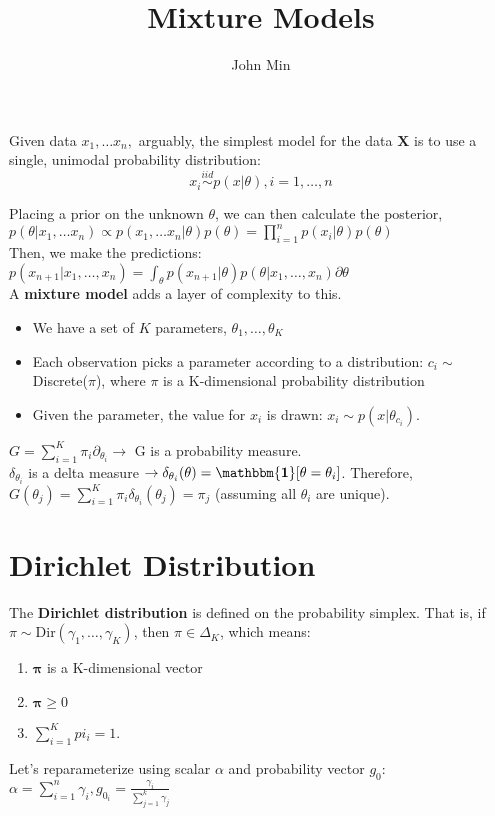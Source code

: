 \documentclass{article}
\title{Mixture Models}
\author{John Min}
\begin{document}
\maketitle

\noindent
Given data $x_1, \ldots x_n,$ arguably, the simplest model for the data $\mathbf{X}$ is to use a single, unimodal probability distribution: 
$$ x_i \overset{iid}{\sim} p(x | \theta), i = 1, \ldots, n $$

\noindent
Placing a prior on the unknown $\theta$, we can then calculate the posterior, $p(\theta | x_1, \ldots x_n ) \propto p(x_1, \ldots x_n | \theta) p(\theta) = \displaystyle \prod_{i=1}^n p(x_i | \theta) p(\theta)$ \\

\noindent
Then, we make the predictions: $p(x_{n+1} | x_1, \ldots, x_n) = \int_\theta p(x_{n+1} | \theta) p(\theta | x_1, \ldots, x_n) \partial \theta$ \\

\noindent
A \textbf{mixture model} adds a layer of complexity to this.
\begin{itemize}
    \item We have a set of $K$ parameters, $\theta_1, \ldots, \theta_K$
    \item Each observation picks a parameter according to a distribution: $c_i \sim$ Discrete($\pi$), where $\pi$ is a K-dimensional probability distribution
    \item Given the parameter, the value for $x_i$ is drawn: $x_i \sim p(x | \theta_{c_i})$.
\end{itemize}


\noindent
$G = \displaystyle \sum_{i=1}^K \pi_i \partial_{\theta_i} \rightarrow$ G is a probability measure. \\
$\delta_{\theta_i}$ is a delta measure $\rightarrow \delta_{\theta_i}(\theta) = \mathbf{\mathbbm{1}}[{\theta = \theta_i}]$.
Therefore, $G(\theta_j) = \displaystyle \sum_{i=1}^K \pi_i \delta_{\theta_i}(\theta_j) = \pi_j$ (assuming all $\theta_i$ are unique). 





\section*{Dirichlet Distribution}
The \textbf{Dirichlet distribution} is defined on the probability simplex.  That is, if $\pi \sim $Dir$(\gamma_1, \ldots, \gamma_K)$, then $\pi \in \Delta_K$, which means:

\begin{enumerate}
    \item $\mathbf{\pi}$ is a K-dimensional vector
    \item $\mathbf{\pi} \geq 0$
    \item $\displaystyle \sum_{i=1}^K pi_i = 1$.
\end{enumerate}

Let's reparameterize using scalar $\alpha$ and probability vector $g_0$: $\alpha = \displaystyle \sum_{i=1}^n \gamma_i, g_{0_i} = \frac{\gamma_i}{\sum_{j=1}^k \gamma_j}$
\end{document}
